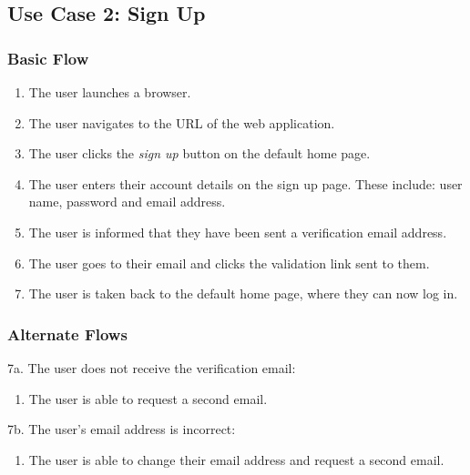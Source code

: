\documentclass[12pt,onecolumn]{article}
\begin{document}
	\subsection{Use Case 2: Sign Up}

		\subsubsection{Basic Flow}

		\begin{enumerate}
			\item The user launches a browser.

			\item The user navigates to the URL of the web application.

			\item The user clicks the \emph{sign up} button on the default home page.

			\item The user enters their account details on the sign up page. These include: user name, password and email address.

			\item The user is informed that they have been sent a verification email address.

			\item The user goes to their email and clicks the validation link sent to them.

			\item The user is taken back to the default home page, where they can now log in.

		\end{enumerate}

		\subsubsection{Alternate Flows}

		7a. The user does not receive the verification email:

		\begin{enumerate}
			\item The user is able to request a second email.
		\end{enumerate}

		7b. The user's email address is incorrect:

		\begin{enumerate}
			\item The user is able to change their email address and request a second email.
		\end{enumerate}
	
\end{document}
